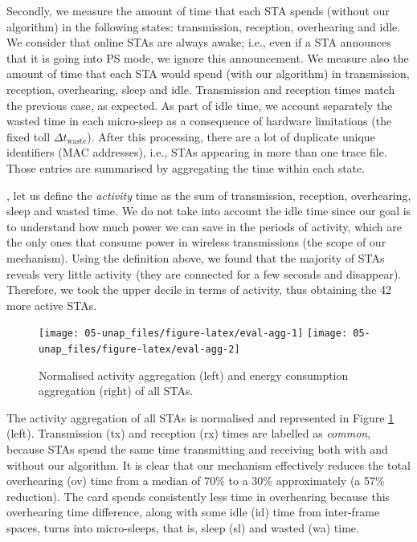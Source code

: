 \documentclass[twoside,nohyper]{tufte-book}
\theoremstyle{definition}
\theoremstyle{definition}
\theoremstyle{definition}
\theoremstyle{remark}
\begin{document}
Secondly, we measure the amount of time that each STA spends (without
our algorithm) in the following states: transmission, reception,
overhearing and idle. We consider that online STAs are always awake;
i.e., even if a STA announces that it is going into PS mode, we ignore
this announcement. We measure also the amount of time that each STA
would spend (with our algorithm) in transmission, reception,
overhearing, sleep and idle. Transmission and reception times match the
previous case, as expected. As part of idle time, we account separately
the wasted time in each micro-sleep as a consequence of hardware
limitations (the fixed toll \(\Delta t_\mathrm{waste}\)). After this
processing, there are a lot of duplicate unique identifiers (MAC
addresses), i.e., STAs appearing in more than one trace file. Those
entries are summarised by aggregating the time within each state.

, let us define the \emph{activity} time as
the sum of transmission, reception, overhearing, sleep and wasted time.
We do not take into account the idle time since our goal is to
understand how much power we can save in the periods of activity, which
are the only ones that consume power in wireless transmissions (the
scope of our mechanism). Using the definition above, we found that the
majority of STAs reveals very little activity (they are connected for a
few seconds and disappear). Therefore, we took the upper decile in terms
of activity, thus obtaining the 42 more active STAs.




\begin{figure}

{\centering \texttt{[image: 05-unap\_files/figure-latex/eval-agg-1]} \texttt{[image: 05-unap\_files/figure-latex/eval-agg-2]} 

}

\caption[Normalised activity aggregation (left) and energy
consumption aggregation (right) of all STAs.]{Normalised activity aggregation (left) and energy
consumption aggregation (right) of all STAs.}\label{fig:eval-agg}
\end{figure}

The activity aggregation of all STAs is normalised and represented in
Figure \ref{fig:eval-agg} (left). Transmission (tx) and reception (rx)
times are labelled as \emph{common}, because STAs spend the same time
transmitting and receiving both with and without our algorithm. It is
clear that our mechanism effectively reduces the total overhearing (ov)
time from a median of 70\% to a 30\% approximately (a 57\% reduction).
The card spends consistently less time in overhearing because this
overhearing time difference, along with some idle (id) time from
inter-frame spaces, turns into micro-sleeps, that is, sleep (sl) and
wasted (wa) time.
\end{document}
